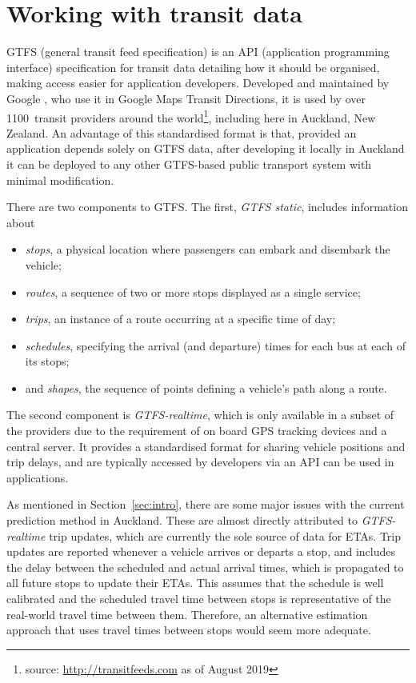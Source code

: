\section{Working with \rt transit data}
\label{sec:gtfs}

GTFS (general transit feed specification)
is an API (application programming interface) specification for transit data
detailing how it should be organised,
making access easier for application developers.
Developed and maintained by Google \citep{GoogleDevelopers_2006},
who use it in Google Maps Transit Directions,
it is used by over 1100~transit providers around the world\footnote{%
source: \url{http://transitfeeds.com} as of August 2019},
including here in Auckland, New Zealand.
An advantage of this standardised format is that,
provided an application depends solely on GTFS data,
after developing it locally in Auckland it can be deployed to any other GTFS-based
public transport system with minimal modification.


There are two components to GTFS.
The first, \emph{GTFS static}, includes information about
\begin{itemize}
\item \emph{stops}, a physical location where passengers can embark and disembark the vehicle;
\item \emph{routes}, a sequence of two or more stops displayed as a single service;
\item \emph{trips}, an instance of a route occurring at a specific time of day;
\item \emph{schedules}, specifying the arrival (and departure) times for each bus at each of its stops; 
\item and \emph{shapes}, the sequence of points defining a vehicle's path along a route.
\end{itemize}
The second component is \emph{GTFS-realtime},
which is only available in a subset of the providers due to the requirement of 
on board GPS tracking devices and a central server.
It provides a standardised format for sharing vehicle positions and trip delays,
and are typically accessed by developers via an API can be used in \rt applications.

As mentioned in Section~\ref{sec:intro},
there are some major issues with the current prediction method in Auckland.
These are almost directly attributed to \emph{GTFS-realtime} trip updates,
which are currently the sole source of data for ETAs.
Trip updates are reported whenever a vehicle arrives or departs a stop,
and includes the delay between the scheduled and actual arrival times,
which is propagated to all future stops to update their ETAs.
This assumes that the schedule is well calibrated 
and the scheduled travel time between stops
is representative of the real-world travel time between them. 
Therefore, an alternative estimation approach that uses \rt travel times 
between stops would seem more adequate.



